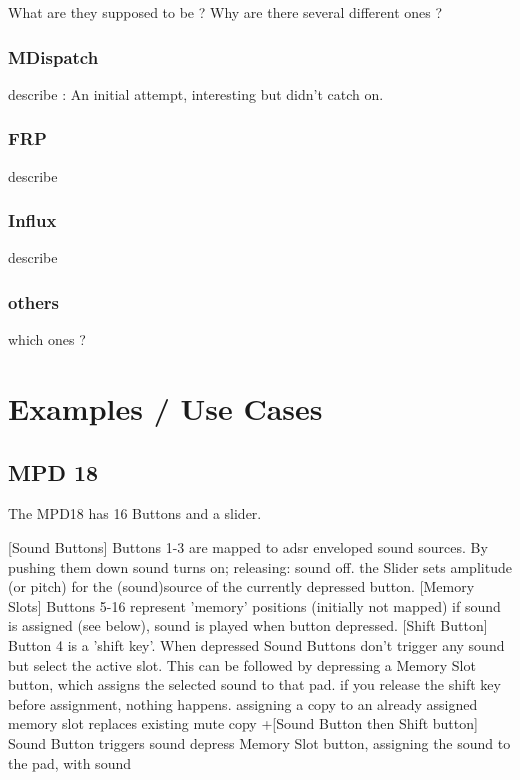 \documentclass{article}
\begin{document}
What are they supposed to be ? Why are there several different ones ?	
	
\subsubsection{MDispatch}	

describe : An initial attempt, interesting but didn't catch on.
		
\subsubsection{FRP}

describe~\cite{-uni}



\subsubsection{Influx}

describe

\subsubsection{others}

which ones ?

\section{Examples / Use Cases}
\label{sec:examples_use_cases}


\subsection{MPD 18}
\label{sub:mpd_18}

The MPD18 has 16 Buttons and a slider.

    [Sound Buttons] Buttons 1-3 are mapped to adsr enveloped sound sources.
        By pushing them down sound turns on; releasing: sound off.
    the Slider sets amplitude (or pitch) for the (sound)source of the currently depressed button.
    [Memory Slots] Buttons 5-16 represent 'memory' positions (initially not mapped)
        if sound is assigned (see below), sound is played when button depressed.
    [Shift Button] Button 4 is a 'shift key'. When depressed
        Sound Buttons don't trigger any sound but select the active slot. This can be followed by
        depressing a Memory Slot button, which assigns the selected sound to that pad.
        if you release the shift key before assignment, nothing happens.
        assigning a copy to an already assigned memory slot replaces existing
        mute copy +[Sound Button then Shift button]
        Sound Button triggers sound
        depress Memory Slot button, assigning the sound to the pad, with sound
\end{document}
